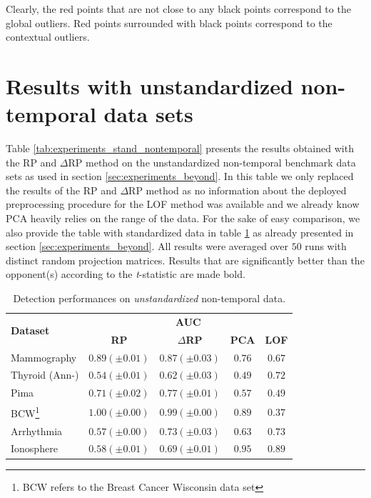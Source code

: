 Clearly, the red points that are not close to any black points correspond to the global outliers. Red points surrounded with black points correspond to the contextual outliers.

\section{Results with unstandardized non-temporal data sets}
\label{sec:app_results_unscaled}

Table \ref{tab:experiments_stand_nontemporal} presents the results obtained with the RP and $\Delta$RP method on the unstandardized non-temporal benchmark data sets as used in section \ref{sec:experiments_beyond}. In this table we only replaced the results of the RP and $\Delta$RP method as no information about the deployed preprocessing procedure for the LOF method was available and we already know PCA heavily relies on the range of the data. For the sake of easy comparison, we also provide the table with standardized data in table \ref{tab:experiments_nontemporal} as already presented in section \ref{sec:experiments_beyond}. All results were averaged over $50$ runs with distinct random projection matrices. Results that are significantly better than the opponent(s) according to the \textit{t}-statistic are made bold. 

\begin{table}[h]
	\centering
	\small
	\caption{Detection performances on \textit{unstandardized} non-temporal data.}
	\label{tab:experiments_nontemporal}
	\begin{tabular}{l c c c c}
		\toprule	
		\multirow{2}{*}{\textbf{Dataset}} & \multicolumn{4}{c}{\textbf{AUC}} \\
		\cmidrule{2-5}
					& \textbf{RP} 				& \textbf{$\Delta$RP} 			&  \textbf{PCA}		& \textbf{LOF}	\\
		\midrule
		Mammography & $\mathbf{0.89 (\pm 0.01)}$& $0.87 (\pm 0.03)$				& $0.76$			& $0.67$  	\\
		Thyroid (Ann-)  & $0.54 (\pm 0.01)$ 	& $0.62 (\pm 0.03)$ 			& $0.49$			& $\mathbf{0.72}$	\\
		Pima 		& $0.71 (\pm 0.02)$ 		& $\mathbf{0.77 (\pm 0.01)}$ 	& $0.57$			& $0.49$	\\	
		BCW\footnote{BCW refers to the Breast Cancer Wisconsin data set}	& $\mathbf{1.00 (\pm 0.00)}$& $0.99 (\pm 0.00)$ 			& $0.89$			& $0.37$	\\
		Arrhythmia	& $0.57 (\pm 0.00)$ 		& $\mathbf{0.73 (\pm 0.03)}$  	& $0.63$			& $\mathbf{0.73}$	\\
		Ionosphere	& $0.58 (\pm 0.01)$ 		& $0.69 (\pm 0.01)$  			& $\mathbf{0.95}$	& $0.89$	\\
		\bottomrule
	\end{tabular}
\end{table}


